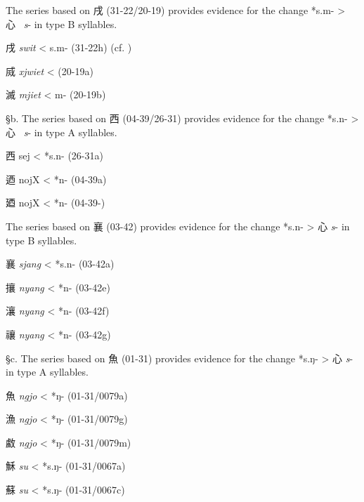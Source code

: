 The series based on 戌 (31-22/20-19) provides evidence for the change
*s.m- \textgreater{} 心~ \emph{s}- in type B syllables.

\begin{description} \item
戌  \emph{swit} \textless{} s.m- (31-22h) 
(cf. \cite[30]{Baxter2012})

\item
烕  \emph{xjwiet} \textless{} {} (20-19a)

\item
滅  \emph{mjiet} \textless{} m- (20-19b)
\end{description}

§b. The series based on 西 (04-39/26-31) provides evidence for the
change *s.n{}- \textgreater{} 心~ \emph{s}- in type A syllables.

\begin{description} \item
西 sej \textless{} *s.n{}- (26-31a)

\item
迺 nojX \textless{} *n{}- (04-39a)

\item
廼 nojX \textless{} *n{}- (04-39-)
\end{description}

The series based on 襄 (03-42) provides evidence for the change *s.n-
\textgreater{} 心 \emph{s}- in type B syllables.

\begin{description} \item
襄 \emph{sjang} \textless{} *s.n- (03-42a)

\item
攘  \emph{nyang} \textless{} *n- (03-42e)

\item
瀼  \emph{nyang} \textless{} *n- (03-42f)

\item
禳  \emph{nyang} \textless{} *n- (03-42g)
\end{description}

§c. The series based on 魚 (01-31) provides evidence for the change
*s.ŋ{}- \textgreater{} 心  \emph{s}- in type A syllables.

\begin{description} \item
魚  \emph{ngjo} \textless{} *ŋ- (01-31/0079a)
 \item
漁  \emph{ngjo} \textless{} *ŋ- (01-31/0079g)
 \item
䱷  \emph{ngjo} \textless{} *ŋ- (01-31/0079m)
 \item
穌  \emph{su} \textless{} *s.ŋ{}- (01-31/0067a)
\item
蘇  \emph{su} \textless{} *s.ŋ{}- (01-31/0067c)
\end{description}

